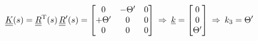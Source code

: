\begin{frame}
  \begin{displaymath}
    \underline{\underline{K}}(s) =
    \underline{\underline{R}}^{\mathrm{T}}(s) \, \underline{\underline{R}}^{\prime}(s) =
    \begin{bmatrix}
      0 & -\Theta^{\prime} & 0 \\
      +\Theta^{\prime} & 0 & 0 \\
      0 & 0 & 0
    \end{bmatrix}
    \: \Rightarrow \:
    \underline{k} =
    \begin{bmatrix}
      0 \\ 0 \\ \Theta^{\prime}
    \end{bmatrix}
    \: \Rightarrow \:
    k_3 = \Theta^{\prime}
  \end{displaymath}
\end{frame}

